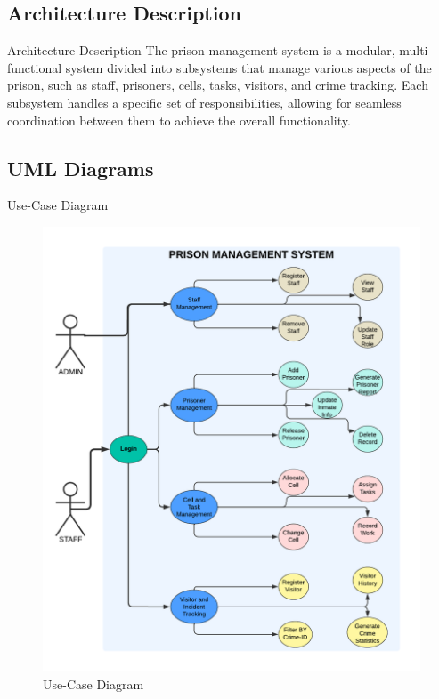 \documentclass[aspectratio=169]{beamer}
\begin{document}
\subsection{Architecture Description}
\begin{frame}{Architecture Description}
The prison management system is a modular, multi-functional system divided into subsystems that manage various aspects of the prison, such as staff, prisoners, cells, tasks, visitors, and crime tracking. Each subsystem handles a specific set of responsibilities, allowing for seamless coordination between them to achieve the overall functionality.\cite{designdoc}
    
\end{frame}
\subsection{UML Diagrams}
\begin{frame}{Use-Case Diagram}
    \begin{figure}
        \centering
        \includegraphics[scale=0.2]{usecase.png}
        \caption{Use-Case Diagram}
        \label{fig:use-case}
    \end{figure}
\end{frame}
\end{document}
